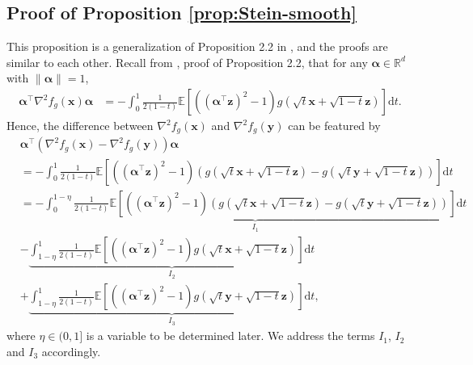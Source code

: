 \subsection{Proof of Proposition \ref{prop:Stein-smooth}}\label{app:proof-Stein-smooth}
This proposition is a generalization of Proposition 2.2 in \cite{gallouet2018regularity}, and the proofs are similar to each other. Recall from \cite{gallouet2018regularity}, proof of Proposition 2.2, that for any $\bm{\alpha} \in \mathbb{R}^d$ with $\|\bm{\alpha}\| =1$,
\begin{align*}
\bm{\alpha}^\top \nabla^2 f_g(\bm{x}) \bm{\alpha} &= -\int_0^1 \frac{1}{2(1-t)}\mathbb{E}\left[((\bm{\alpha}^\top \bm{z})^2 -1)g(\sqrt{t}\bm{x}+\sqrt{1-t}\bm{z})\right] \mathrm{d}t.
\end{align*}
Hence, the difference between $\nabla^2 f_g(\bm{x})$ and $\nabla^2 f_g(\bm{y})$ can be featured by
\begin{align}\label{eq:Stein-smooth-decompose}
&\bm{\alpha}^\top (\nabla^2 f_g(\bm{x})-\nabla^2 f_g(\bm{y})) \bm{\alpha} \nonumber \\ 
&= -\int_0^1 \frac{1}{2(1-t)}\mathbb{E}\left[((\bm{\alpha}^\top \bm{z})^2 -1)\left(g(\sqrt{t}\bm{x}+\sqrt{1-t}\bm{z})-g(\sqrt{t}\bm{y}+\sqrt{1-t}\bm{z})\right)\right] \mathrm{d}t \nonumber \\ 
&= -\underset{I_1}{\underbrace{\int_0^{1-\eta} \frac{1}{2(1-t)}\mathbb{E}\left[((\bm{\alpha}^\top \bm{z})^2 -1)\left(g(\sqrt{t}\bm{x}+\sqrt{1-t}\bm{z})-g(\sqrt{t}\bm{y}+\sqrt{1-t}\bm{z})\right)\right] \mathrm{d}t}} \nonumber \\ 
&- \underset{I_2}{\underbrace{\int_{1-\eta}^1 \frac{1}{2(1-t)}\mathbb{E}\left[((\bm{\alpha}^\top \bm{z})^2 -1)g(\sqrt{t}\bm{x}+\sqrt{1-t}\bm{z})\right] \mathrm{d}t}} \nonumber \\ 
&+ \underset{I_3}{\underbrace{\int_{1-\eta}^1 \frac{1}{2(1-t)}\mathbb{E}\left[((\bm{\alpha}^\top \bm{z})^2 -1)g(\sqrt{t}\bm{y}+\sqrt{1-t}\bm{z})\right] \mathrm{d}t}},
\end{align} 
where $\eta \in (0,1]$ is a variable to be determined later. We address the terms $I_1$, $I_2$ and $I_3$ accordingly.
